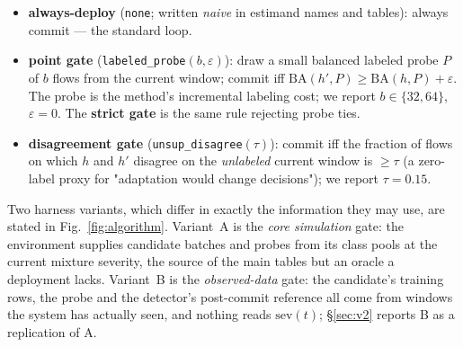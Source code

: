 \documentclass[journal]{IEEEtran}
\begin{document}
\begin{itemize}
  \item \textbf{always-deploy} (\texttt{none}; written \emph{naive} in estimand names and tables): always commit --- the standard loop.
  \item \textbf{point gate} (\texttt{labeled\_probe}$(b,\varepsilon)$): draw a small balanced labeled probe $P$ of $b$ flows from the current window; commit iff $\mathrm{BA}(h',P) \ge \mathrm{BA}(h,P) + \varepsilon$. The probe is the method's incremental labeling cost; we report $b\in\{32,64\}$, $\varepsilon=0$. The \textbf{strict gate} is the same rule rejecting probe ties.
  \item \textbf{disagreement gate} (\texttt{unsup\_disagree}$(\tau)$): commit iff the fraction of flows on which $h$ and $h'$ disagree on the \emph{unlabeled} current window is $\ge \tau$ (a zero-label proxy for "adaptation would change decisions"); we report $\tau=0.15$.
\end{itemize}

Two harness variants, which differ in exactly the information they may use, are stated in Fig.~\ref{fig:algorithm}. Variant~A is the \emph{core simulation} gate: the environment supplies candidate batches and probes from its class pools at the current mixture severity, the source of the main tables but an oracle a deployment lacks. Variant~B is the \emph{observed-data} gate: the candidate's training rows, the probe and the detector's post-commit reference all come from windows the system has actually seen, and nothing reads $\mathrm{sev}(t)$; \S\ref{sec:v2} reports B as a replication of A.
\end{document}
